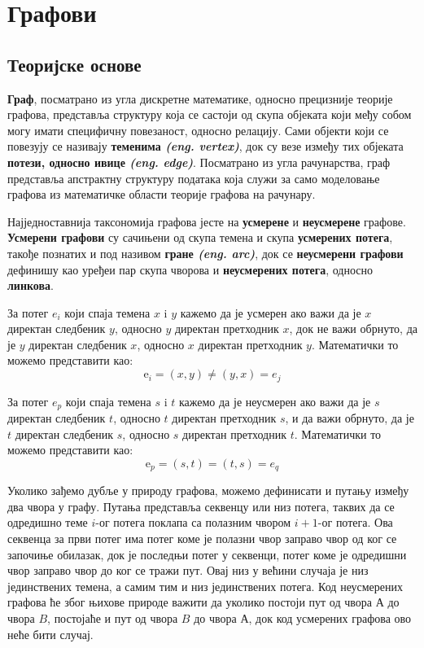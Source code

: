 \chapter{Графови}

\section{Теоријске основе}
\textbf{Граф}, посматрано из угла дискретне математике, односно прецизније теорије графова, представља структуру која се састоји од скупа објеката који међу собом могу имати специфичну повезаност, односно релацију. Сами објекти који се повезују се називају \textbf{теменима \textit{(eng. vertex)}}, док су везе између тих објеката \textbf{потези, односно ивице \textit{(eng. edge)}}. Посматрано из угла рачунарства, граф представља апстрактну структуру података која служи за само моделовање графова из математичке области теорије графова на рачунару.

\par
Најједноставнија таксономија графова јесте на \textbf{усмерене} и \textbf{неусмерене} графове. \textbf{Усмерени графови} су сачињени од скупа темена и скупа \textbf{усмерених потега}, такође познатих и под називом \textbf{гране \textit{(eng. arc)}}, док се \textbf{неусмерени графови} дефинишу као уређеи пар скупа чворова и \textbf{неусмерених потега}, односно \textbf{линкова}. 

\par
За потег $e_i$ који спаја темена $x$ i $y$ кажемо да је усмерен ако важи да је $x$ директан следбеник $y$, односно $y$ директан претходник $x$, док не важи обрнуто, да је $y$ директан следбеник $x$, односно $x$ директан претходник $y$. Математички то можемо представити као:
$$\text{e}_i = (x, y) \neq (y, x) = e_j$$  

\par
За потег $e_p$ који спаја темена $s$ i $t$ кажемо да је неусмерен ако важи да је $s$ директан следбеник $t$, односно $t$ директан претходник $s$, и да важи обрнуто, да је $t$ директан следбеник $s$, односно $s$ директан претходник $t$. Математички то можемо представити као:
$$\text{e}_p = (s, t) = (t, s) = e_q$$  

\par
Уколико зађемо дубље у природу графова, можемо дефинисати и путању између два чвора у графу. Путања представља секвенцу или низ потега, таквих да се одредишно теме $i$-ог потега поклапа са полазним чвором $i+1$-ог потега.
Ова секвенца за први потег има потег коме је полазни чвор заправо чвор од ког се започиње обилазак, док је последњи потег у секвенци, потег коме је одредишни чвор заправо чвор до ког се тражи пут. Овај низ у већини случаја је низ јединствених темена, а самим тим и низ јединствених потега. Код неусмерених графова ће због њихове природе важити да уколико постоји пут од чвора $А$ до чвора $B$, постојаће и пут од чвора $B$ до чвора $А$, док код усмерених графова ово неће бити случај.

